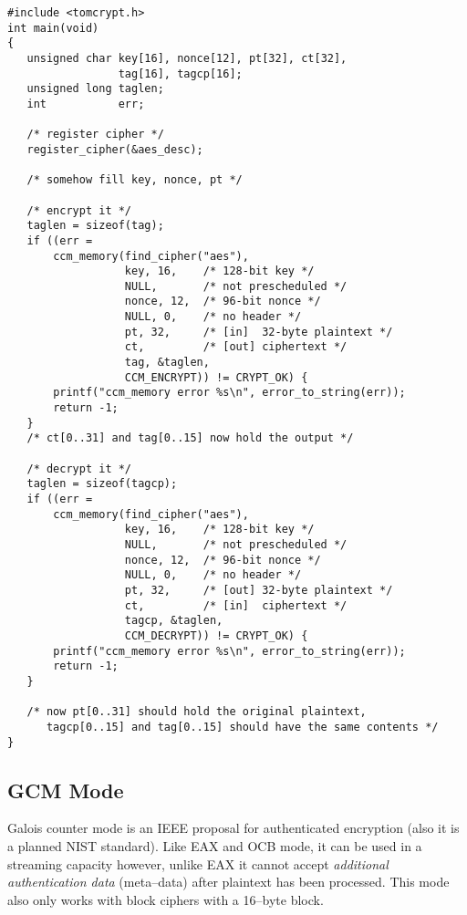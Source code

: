 \documentclass[synpaper]{book}
\begin{document}
\begin{small}
\begin{verbatim}
#include <tomcrypt.h>
int main(void)
{
   unsigned char key[16], nonce[12], pt[32], ct[32],
                 tag[16], tagcp[16];
   unsigned long taglen;
   int           err;

   /* register cipher */
   register_cipher(&aes_desc);

   /* somehow fill key, nonce, pt */

   /* encrypt it */
   taglen = sizeof(tag);
   if ((err =
       ccm_memory(find_cipher("aes"),
                  key, 16,    /* 128-bit key */
                  NULL,       /* not prescheduled */
                  nonce, 12,  /* 96-bit nonce */
                  NULL, 0,    /* no header */
                  pt, 32,     /* [in]  32-byte plaintext */
                  ct,         /* [out] ciphertext */
                  tag, &taglen,
                  CCM_ENCRYPT)) != CRYPT_OK) {
       printf("ccm_memory error %s\n", error_to_string(err));
       return -1;
   }
   /* ct[0..31] and tag[0..15] now hold the output */

   /* decrypt it */
   taglen = sizeof(tagcp);
   if ((err =
       ccm_memory(find_cipher("aes"),
                  key, 16,    /* 128-bit key */
                  NULL,       /* not prescheduled */
                  nonce, 12,  /* 96-bit nonce */
                  NULL, 0,    /* no header */
                  pt, 32,     /* [out] 32-byte plaintext */
                  ct,         /* [in]  ciphertext */
                  tagcp, &taglen,
                  CCM_DECRYPT)) != CRYPT_OK) {
       printf("ccm_memory error %s\n", error_to_string(err));
       return -1;
   }

   /* now pt[0..31] should hold the original plaintext,
      tagcp[0..15] and tag[0..15] should have the same contents */
}
\end{verbatim}
\end{small}

\subsection{GCM Mode}
Galois counter mode is an IEEE proposal for authenticated encryption (also it is a planned NIST standard).  Like EAX and OCB mode, it can be used in a streaming capacity
however, unlike EAX it cannot accept \textit{additional authentication data} (meta--data) after plaintext has been processed.  This mode also only works with
block ciphers with a 16--byte block.
\end{document}
